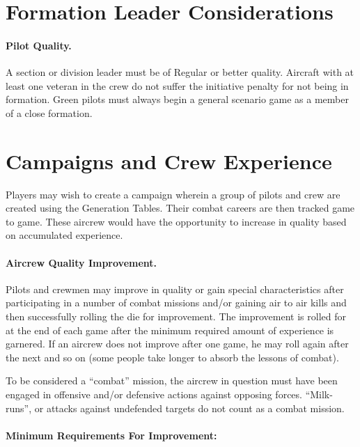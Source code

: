\begin{advancedrules}
\begin{itemize}
\end{itemize}

\section{Formation Leader Considerations}

\paragraph{Pilot Quality.} A section or division leader must be of Regular or better quality. Aircraft with at least one veteran in the crew do not suffer the initiative penalty for not being in formation. Green pilots must always begin a general scenario game as a member of a close formation.

\section{Campaigns and Crew Experience}

Players may wish to create a campaign wherein a group of pilots and crew are created using the Generation Tables. Their combat careers are then tracked game to game. These aircrew would have the opportunity to increase in quality based on accumulated experience.

\paragraph{Aircrew Quality Improvement.} Pilots and crewmen may improve in quality or gain special characteristics after participating in a number of combat missions and/or gaining air to air kills and then successfully rolling the die for improvement. The improvement is rolled for at the end of each game after the minimum required amount of experience is garnered. If an aircrew does not improve after one game, he may roll again after the next and so on (some people take longer to absorb the lessons of combat).

To be considered a “combat” mission, the aircrew in question must have been engaged in offensive and/or defensive actions against opposing forces. “Milk-runs”, or attacks against undefended targets do not count as a combat mission.

\paragraph{Minimum Requirements For Improvement:}


\end{advancedrules}
